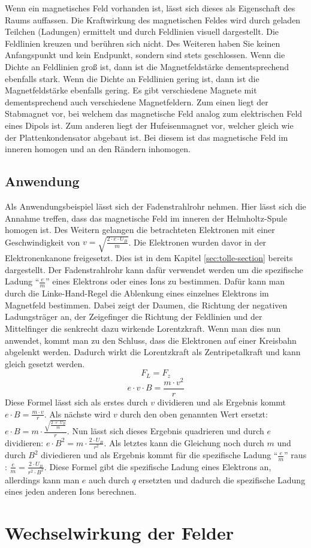 Wenn ein magnetisches Feld vorhanden ist, lässt sich dieses als Eigenschaft des Raums auffassen.
Die Kraftwirkung des magnetischen Feldes wird durch geladen Teilchen (Ladungen) ermittelt und durch Feldlinien visuell dargestellt.
Die Feldlinien kreuzen und berühren sich nicht.
Des Weiteren haben Sie keinen Anfangspunkt und kein Endpunkt, sondern sind stets geschlossen.
Wenn die Dichte an Feldlinien groß ist, dann ist die Magnetfeldstärke dementsprechend ebenfalls stark.
Wenn die Dichte an Feldlinien gering ist, dann ist die Magnetfeldstärke ebenfalls gering.
Es gibt verschiedene Magnete mit dementsprechend auch verschiedene Magnetfeldern. 
Zum einen liegt der Stabmagnet vor, bei welchem das magnetische Feld analog zum elektrischen Feld eines Dipols ist.
Zum anderen liegt der Hufeisenmagnet vor, welcher gleich wie der Plattenkondensator abgebaut ist.
Bei diesem ist das magnetische Feld im inneren homogen und an den Rändern inhomogen. 
\subsection{Anwendung}
Als Anwendungsbeispiel lässt sich der Fadenstrahlrohr nehmen.
Hier lässt sich die Annahme treffen, dass das magnetische Feld im inneren der Helmholtz-Spule homogen ist. Des Weitern gelangen die betrachteten Elektronen mit einer Geschwindigkeit von $v=\sqrt{\frac{2 \cdot e \cdot U_B}{m}}$. Die Elektronen wurden davor in der Elektronenkanone freigesetzt.
Dies ist in dem Kapitel \ref{sec:tolle-section} bereits dargestellt. 
Der Fadenstrahlrohr kann dafür verwendet werden um die spezifische Ladung "`$\frac{e}{m}$"' eines Elektrons oder eines Ions zu bestimmen.
Dafür kann man durch die Linke-Hand-Regel die Ablenkung eines einzelnes Elektrons im Magnetfeld bestimmen. Dabei zeigt der Daumen, die Richtung der negativen Ladungsträger an, der Zeigefinger die Richtung der Feldlinien und der Mittelfinger die senkrecht dazu wirkende Lorentzkraft.
Wenn man dies nun anwendet, kommt man zu den Schluss, dass die Elektronen auf einer Kreisbahn abgelenkt werden. 
Dadurch wirkt die Lorentzkraft als Zentripetalkraft und kann gleich gesetzt werden.
$$F_L = F_z$$
$$e \cdot v \cdot B = \frac{m \cdot v^2}{r}$$
Diese Formel lässt sich als erstes durch $v$ dividieren und als Ergebnis kommt $e \cdot B = \frac{m \cdot v}{r}$.
Als nächste wird $v$ durch den oben genannten Wert %
ersetzt: $e \cdot B = m \cdot \frac{\sqrt{\frac{2 \cdot e \cdot U_B}{m}}}{r}$.
Nun lässt sich dieses Ergebnis quadrieren und durch $e$ dividieren: $e \cdot B^2 = m \cdot \frac{2 \cdot U_B}{r^2}$.
Als letztes kann die Gleichung noch durch $m$ und durch $B^2$ diviedieren und als Ergebnis kommt für die spezifische Ladung "`$\frac{e}{m}$"' raus : $\frac{e}{m} = \frac{2 \cdot U_B}{ r^2 \cdot B^2}$.
Diese Formel gibt die spezifische Ladung eines Elektrons an, allerdings kann man $e$ auch durch $q$ ersetzten und dadurch die spezifische Ladung eines jeden anderen Ions berechnen.
\section{Wechselwirkung der Felder}%
